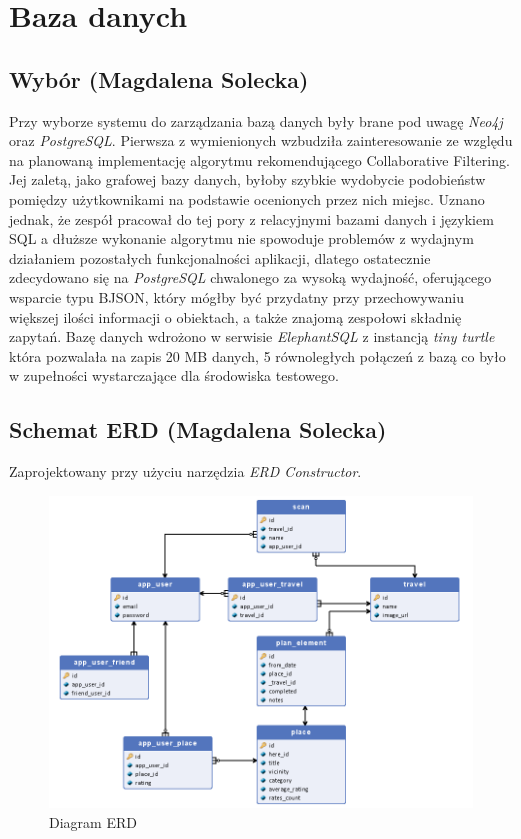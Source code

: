 \documentclass[10pt,twoside,a4paper]{report}
\begin{document}
\chapter{Baza danych}
\section{Wybór (Magdalena Solecka)}
\par Przy wyborze systemu do zarządzania bazą danych były brane pod uwagę \textit{Neo4j}\cite{Neo4j} oraz \textit{PostgreSQL}\cite{PostreSQL}. Pierwsza z wymienionych wzbudziła zainteresowanie ze względu na planowaną implementację algorytmu rekomendującego Collaborative Filtering. Jej zaletą, jako grafowej bazy danych, byłoby szybkie wydobycie podobieństw pomiędzy użytkownikami na podstawie ocenionych przez nich miejsc. Uznano jednak, że zespół pracował do tej pory z relacyjnymi bazami danych i językiem SQL a dłuższe wykonanie algorytmu nie spowoduje problemów z wydajnym działaniem pozostałych funkcjonalności aplikacji, dlatego ostatecznie zdecydowano się na \textit{PostgreSQL} chwalonego za wysoką wydajność, oferującego wsparcie typu BJSON, który mógłby być przydatny przy  przechowywaniu większej ilości informacji o obiektach, a także znajomą zespołowi składnię zapytań. Bazę danych wdrożono w serwisie \textit{ElephantSQL} z instancją \textit{tiny turtle}
 która pozwalała na zapis 20 MB danych, 5 równoległych połączeń z bazą co było w zupełności wystarczające dla środowiska testowego.

\section{Schemat ERD (Magdalena Solecka)}
\par Zaprojektowany przy użyciu narzędzia \textit{ERD Constructor}.

\noindent\newline
\begin{figure}[h]
\centering
\includegraphics[width=\linewidth]{erd}
\caption{Diagram ERD}
\label{fig:erd}
\end{figure}
\FloatBarrier
\end{document}
